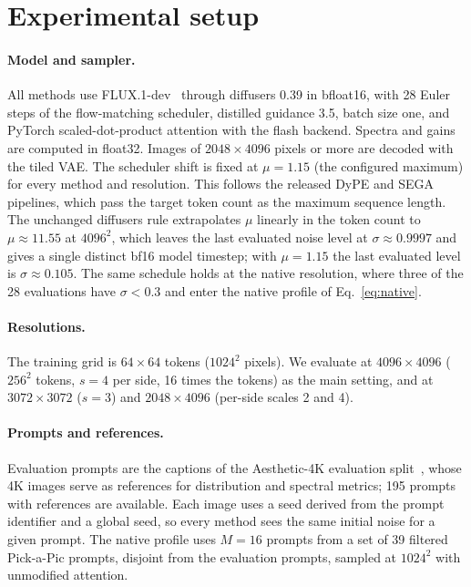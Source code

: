 \section{Experimental setup}
\label{sec:setup}

\paragraph{Model and sampler.}
All methods use FLUX.1-dev~\citep{flux2024} through diffusers 0.39 in bfloat16, with 28 Euler steps of the flow-matching scheduler, distilled guidance 3.5, batch size one, and PyTorch scaled-dot-product attention with the flash backend. Spectra and gains are computed in float32. Images of $2048\times4096$ pixels or more are decoded with the tiled VAE. The scheduler shift is fixed at $\mu=1.15$ (the configured maximum) for every method and resolution. This follows the released DyPE and SEGA pipelines, which pass the target token count as the maximum sequence length. The unchanged diffusers rule extrapolates $\mu$ linearly in the token count to $\mu\approx11.55$ at $4096^2$, which leaves the last evaluated noise level at $\sigma\approx0.9997$ and gives a single distinct bf16 model timestep; with $\mu=1.15$ the last evaluated level is $\sigma\approx0.105$. The same schedule holds at the native resolution, where three of the 28 evaluations have $\sigma<0.3$ and enter the native profile of Eq.~\eqref{eq:native}.

\paragraph{Resolutions.}
The training grid is $64\times64$ tokens ($1024^2$ pixels). We evaluate at $4096\times4096$ ($256^2$ tokens, $s=4$ per side, 16 times the tokens) as the main setting, and at $3072\times3072$ ($s=3$) and $2048\times4096$ (per-side scales 2 and 4). 

\paragraph{Prompts and references.}
Evaluation prompts are the captions of the Aesthetic-4K evaluation split~\citep{zhang2025diffusion4k}, whose 4K images serve as references for distribution and spectral metrics; 195 prompts with references are available.  Each image uses a seed derived from the prompt identifier and a global seed, so every method sees the same initial noise for a given prompt. The native profile uses $M=16$ prompts from a set of 39 filtered Pick-a-Pic prompts, disjoint from the evaluation prompts, sampled at $1024^2$ with unmodified attention.

